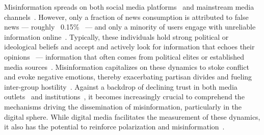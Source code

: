 \documentclass[12pt,twoside]{article}
\begin{document}
Misinformation spreads on both social media platforms~\citep{lazerScienceFakeNews2018} and mainstream media channels~\citep{tsfatiCausesConsequencesMainstream2020}. 
However, only a fraction of news consumption is attributed to false news --- roughly ~0.15\%~\citep{allenEvaluatingFakeNews2020} --- and only a minority of users engage with unreliable information online~\citep{baribi-bartovSupersharersFakeNews2024, grinbergFakeNewsTwitter2019}. 
Typically, these individuals hold strong political or ideological beliefs and accept and actively look for information that echoes their opinions~\citep{eckerPsychologicalDriversMisinformation2022} --- information that often comes from political elites or established media sources~\citep{tsfatiCausesConsequencesMainstream2020}. 
Misinformation capitalizes on these dynamics to stoke conflict and evoke negative emotions, thereby exacerbating partisan divides and fueling inter-group hostility~\citep{gonzalez-bailonAsymmetricIdeologicalSegregation2023a, robertsonUsersChooseEngage2023a}. 
Against a backdrop of declining trust in both media outlets~\citep{newmanReutersInstituteDigital2023} and institutions~\citep{bennettDisinformationAge2020}, it becomes increasingly crucial to comprehend the mechanisms driving the dissemination of misinformation, particularly in the digital sphere. 
While digital media facilitates the measurement of these dynamics, it also has the potential to reinforce polarization and misinformation~\citep{lorenz-spreenSystematicReviewWorldwide2022}.
\end{document}
